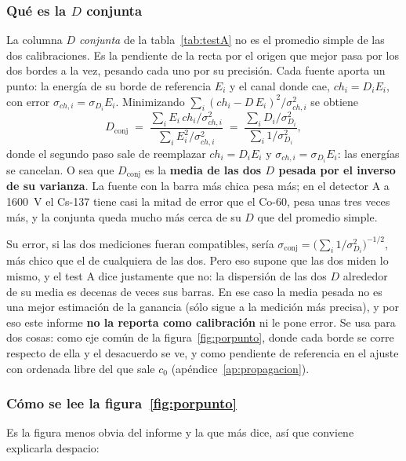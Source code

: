 \documentclass[11pt,a4paper]{article}
\begin{document}
\subsubsection{Qué es la $D$ conjunta}
\label{sec:dconj}

La columna \emph{$D$ conjunta} de la tabla~\ref{tab:testA} no es el promedio
simple de las dos calibraciones. Es la pendiente de la recta por el origen que
mejor pasa por los dos bordes a la vez, pesando cada uno por su precisión.
Cada fuente aporta un punto: la energía de su borde de referencia $E_i$ y el
canal donde cae, $ch_i = D_i E_i$, con error $\sigma_{ch,i} = \sigma_{D_i}E_i$.
Minimizando $\sum_i (ch_i - D\,E_i)^2/\sigma_{ch,i}^2$ se obtiene
\[
   D_{\text{conj}} \;=\; \frac{\sum_i E_i\,ch_i/\sigma_{ch,i}^2}
                             {\sum_i E_i^2/\sigma_{ch,i}^2}
   \;=\; \frac{\sum_i D_i/\sigma_{D_i}^2}{\sum_i 1/\sigma_{D_i}^2},
\]
donde el segundo paso sale de reemplazar $ch_i = D_iE_i$ y
$\sigma_{ch,i} = \sigma_{D_i}E_i$: las energías se cancelan. O sea que
$D_{\text{conj}}$ es la \textbf{media de las dos $D$ pesada por el inverso de
su varianza}. La fuente con la barra más chica pesa más; en el detector A a
1600~V el Cs-137 tiene casi la mitad de error que el Co-60, pesa unas tres
veces más, y la conjunta queda mucho más cerca de su $D$ que del promedio
simple.

Su error, si las dos mediciones fueran compatibles, sería
$\sigma_{\text{conj}} = \big(\sum_i 1/\sigma_{D_i}^2\big)^{-1/2}$, más chico
que el de cualquiera de las dos. Pero eso supone que las dos miden lo mismo,
y el test A dice justamente que no: la dispersión de las dos $D$ alrededor de
su media es decenas de veces sus barras. En ese caso la media pesada no es una
mejor estimación de la ganancia (sólo sigue a la medición más precisa), y por
eso este informe \textbf{no la reporta como calibración} ni le pone error. Se
usa para dos cosas: como eje común de la figura~\ref{fig:porpunto}, donde cada
borde se corre respecto de ella y el desacuerdo se ve, y como pendiente de
referencia en el ajuste con ordenada libre del que sale $c_0$
(apéndice~\ref{ap:propagacion}).

\subsubsection{Cómo se lee la figura~\ref{fig:porpunto}}
\label{sec:leer-porpunto}

Es la figura menos obvia del informe y la que más dice, así que conviene
explicarla despacio:
\end{document}
